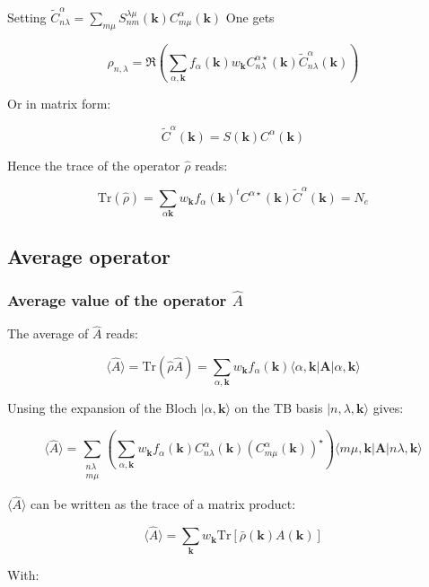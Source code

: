 \documentclass{article}
\newcommand{\bra}[1]{\langle #1|}
\newcommand{\ket}[1]{|#1\rangle}
\newcommand{\op}[1]{\hat{#1}}
\begin{document}
\noindent
Setting $\displaystyle \widetilde{C}_{n\lambda}^{\alpha}=\sum_{m \mu} 
S_{nm}^{\lambda \mu}(\mathbf{k}) C_{m \mu}^{\alpha}(\mathbf{k})$
\noindent
One gets

\[\displaystyle \rho_{n,\lambda}= \Re \left(
\sum_{\alpha,\mathbf{k}} f_{\alpha}(\mathbf{k})w_{\mathbf{k}}
C_{n \lambda}^{\alpha \star}(\mathbf{k})\widetilde{C}_{n\lambda}^{\alpha }(\mathbf{k})
 \right)\]

\noindent
Or in matrix form:

\[ 
\widetilde{C}^{\alpha}(\mathbf{k})=S(\mathbf{k})C^{\alpha}(\mathbf{k}) 
\]

\noindent
Hence the trace of the operator $\op{\rho}$ reads:

\[ \mbox{Tr} (\op{\rho })= 
\sum_{\alpha \mathbf{k}} w_{\mathbf{k}}
f_{\alpha}(\mathbf{k}) ^tC^{\alpha
\star}(\mathbf{k})\widetilde{C}^{\alpha}(\mathbf{k}) =N_e\]


\subsection{Average operator}


\subsubsection{Average value of the operator $\op{A}$}


\noindent The average of $\op{ A}$ reads:

\[ \langle \op{A} \rangle =\mbox{Tr} (\op{\rho} \op{A})=\sum_{\alpha,\mathbf{k}}
w_{\mathbf{k}}f_{\alpha}(\mathbf{k}) \bra{\alpha,\mathbf{k}}\bm{A}\ket{\alpha,\mathbf{k}} \]

\noindent
Unsing the expansion of the Bloch $\ket{\alpha,\mathbf{k}}$ on the TB basis $\ket{n,\lambda,\mathbf{k}}$ gives:


\[ \displaystyle  \langle \op{A}\rangle=  \sum_{\substack{n \lambda \\ m \mu}} 
\left( \sum_{\alpha,\mathbf{k}} w_{\mathbf{k}} f_{\alpha}(\mathbf{k}) 
C_{n \lambda}^{\alpha}(\mathbf{k})(C_{m \mu}^{\alpha}(\mathbf{k}))^{\star} \right)   
\bra{ m \mu,\mathbf{k}}{\bm A} \ket{n \lambda,\mathbf{k}} \]


\noindent
$\langle \op{A} \rangle$ can be written as the trace of a matrix product:

\[ \langle \op{A} \rangle=\sum_{\mathbf{k}} w_{\mathbf{k}} \text{Tr} \left[\bar{\rho}(\mathbf{k}) A(\mathbf{k}) \right] \]

\noindent
With:
\end{document}
